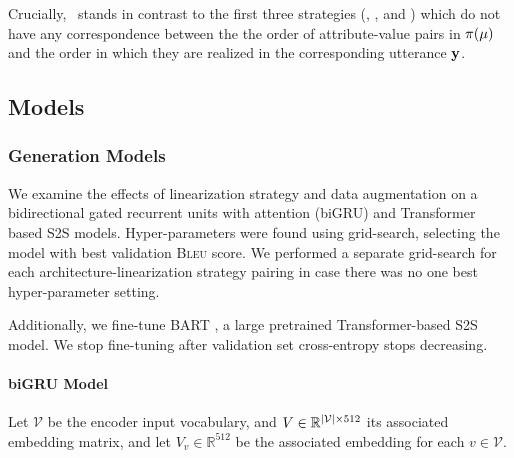 Crucially, \alignmenttraining~stands in contrast to the  first three strategies
(, , and ) which do not have any
correspondence between the the order of attribute-value pairs in $\pi(\mu)$
and the order in which they are realized in the corresponding
utterance $\mathbf{y}$.










\subsection{Models}
\subsubsection{Generation Models}
We examine the effects of linearization strategy and data augmentation
on a bidirectional gated recurrent units with attention (biGRU)
and Transformer based S2S models.
Hyper-parameters were found using grid-search, selecting the model
with best validation \textsc{Bleu} \cite{papineni2002bleu} score. We performed a separate
grid-search for each architecture-linearization strategy pairing in case
there was no one best hyper-parameter setting.

Additionally, we
fine-tune BART \cite{lewis2019bart}, a large pretrained Transformer-based S2S model. We stop fine-tuning after validation set cross-entropy stops decreasing.

\paragraph{biGRU Model}
Let $\mathcal{V}$ be the encoder input vocabulary, and  $V \in\mathbb{R}^{|\mathcal{V}|\times 512}$ its associated embedding matrix, and let
$V_v \in \mathbb{R}^{512}$ be the associated embedding for
each $v \in \mathcal{V}$.

